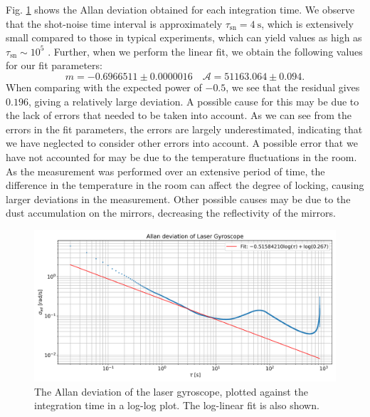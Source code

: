 \documentclass[a4paper]{report}
\numberwithin{equation}{section}
\begin{document}
Fig. \ref{fig:allan} shows the Allan deviation obtained for each integration time. We observe that the shot-noise time interval is approximately $\tau_{\mathrm{sn}} = \SI{4}{\second}$, which is extensively small 
compared to those in typical experiments, which can yield values as high as $\tau_{\mathrm{sn}} \sim 10^{5}$ \cite{Groh2021}. 
Further, when we perform the linear fit, we obtain the following values for our fit parameters: 
\begin{equation}
	m = -0.6966511 \pm 0.0000016 \quad \mathcal{A} = 51163.064 \pm 0.094. 
\end{equation}
When comparing with the expected power of $-0.5$, we see that the residual gives $0.196$, giving a relatively large deviation. 
A possible cause for this may be due to the lack of errors that needed to be taken into account. As we can see from the errors in 
the fit parameters, the errors are largely underestimated, indicating that we have neglected to consider other errors into account.
A possible error that we have not accounted for may be due to the temperature fluctuations in the room. As the measurement was performed
over an extensive period of time, the difference in the temperature in the room can affect the degree of locking, causing larger 
deviations in the measurement. Other possible causes may be due to the dust accumulation on the mirrors, decreasing the reflectivity of the 
mirrors. \par 

\begin{figure}[h!]
	\centering
	\includegraphics[width=0.8\columnwidth]{allan.png}
	\caption{The Allan deviation of the laser gyroscope, plotted against the integration time in a log-log plot. The log-linear fit
	is also shown.}
	\label{fig:allan}
\end{figure}
\end{document}
